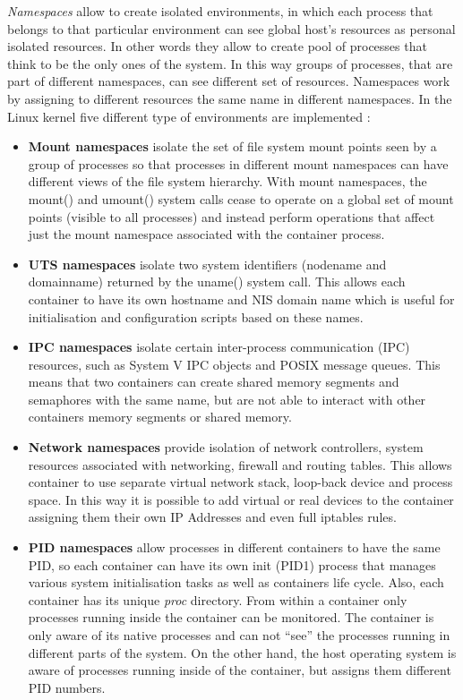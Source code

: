 \documentclass[a4paper,12pt]{article}
\begin{document}
\textit{Namespaces} allow to create isolated environments, in which each process
that belongs to that particular environment can see global host's resources as
personal isolated resources. In other words they allow to create pool of
processes that think to be the only ones of the system. In this way groups of
processes, that are part of different namespaces, can see different set of
resources. Namespaces work by assigning to different resources the same name in
different namespaces. In the Linux kernel five different type of environments
are implemented \cite{red_hat_introduction_to_namespaces}:
  \begin{itemize}
    \item \textbf{Mount namespaces} isolate the set of file system mount points
    seen by a group of processes so that processes in different mount namespaces
    can have different views of the file system hierarchy. With mount
    namespaces, the mount() and umount() system calls cease to operate on a
    global set of mount points (visible to all processes) and instead perform
    operations that affect just the mount namespace associated with the
    container process. 
    \item \textbf{UTS namespaces} isolate two system identifiers (nodename and
    domainname) returned by the uname() system call. This allows each container
    to have its own hostname and NIS domain name which is useful for
    initialisation and configuration scripts based on these names. 
    \item \textbf{IPC namespaces} isolate certain inter-process communication
    (IPC) resources, such as System V IPC objects and POSIX message queues. This
    means that two containers can create shared memory segments and semaphores
    with the same name, but are not able to interact with other containers
    memory segments or shared memory. 
    \item \textbf{Network namespaces} provide isolation of network controllers,
    system resources associated with networking, firewall and routing tables.
    This allows container to use separate virtual network stack, loop-back device
    and process space. In this way it is possible to add virtual or real devices
    to the container assigning them their own IP Addresses and even full iptables
    rules. 
    \item \textbf{PID namespaces} allow processes in different containers to
    have the same PID, so each container can have its own init (PID1) process
    that manages various system initialisation tasks as well as containers life
    cycle. Also, each container has its unique \textit{\/proc} directory. From
    within a container only processes running inside the container can be
    monitored. The container is only aware of its native processes and can not
    ``see'' the processes running in different parts of the system. On the other
    hand, the host operating system is aware of processes running inside of the
    container, but assigns them different PID numbers.
  \end{itemize} 
\end{document}
